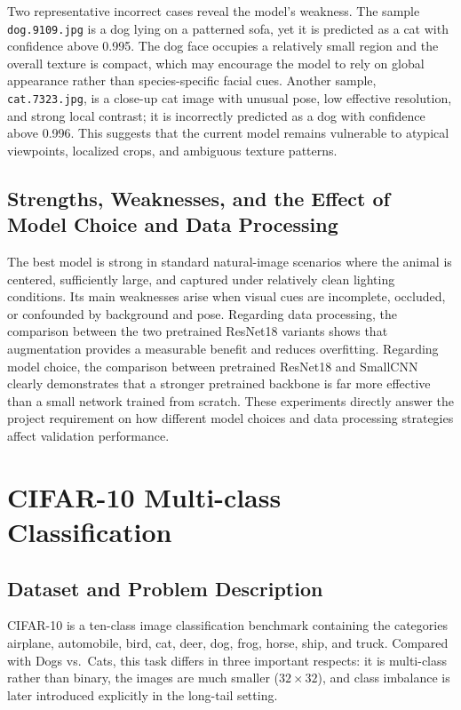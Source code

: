 \documentclass[11pt,a4paper]{article}
\begin{document}
Two representative incorrect cases reveal the model's weakness. The sample \texttt{dog.9109.jpg} is a dog lying on a patterned sofa, yet it is predicted as a cat with confidence above 0.995. The dog face occupies a relatively small region and the overall texture is compact, which may encourage the model to rely on global appearance rather than species-specific facial cues. Another sample, \texttt{cat.7323.jpg}, is a close-up cat image with unusual pose, low effective resolution, and strong local contrast; it is incorrectly predicted as a dog with confidence above 0.996. This suggests that the current model remains vulnerable to atypical viewpoints, localized crops, and ambiguous texture patterns.

\subsection{Strengths, Weaknesses, and the Effect of Model Choice and Data Processing}
The best model is strong in standard natural-image scenarios where the animal is centered, sufficiently large, and captured under relatively clean lighting conditions. Its main weaknesses arise when visual cues are incomplete, occluded, or confounded by background and pose. Regarding data processing, the comparison between the two pretrained ResNet18 variants shows that augmentation provides a measurable benefit and reduces overfitting. Regarding model choice, the comparison between pretrained ResNet18 and SmallCNN clearly demonstrates that a stronger pretrained backbone is far more effective than a small network trained from scratch. These experiments directly answer the project requirement on how different model choices and data processing strategies affect validation performance.

\section{CIFAR-10 Multi-class Classification}

\subsection{Dataset and Problem Description}
CIFAR-10 is a ten-class image classification benchmark containing the categories airplane, automobile, bird, cat, deer, dog, frog, horse, ship, and truck. Compared with Dogs vs.\ Cats, this task differs in three important respects: it is multi-class rather than binary, the images are much smaller ($32\times32$), and class imbalance is later introduced explicitly in the long-tail setting.
\end{document}
